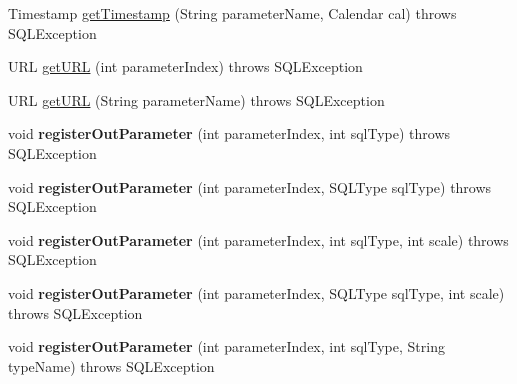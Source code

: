 \begin{DoxyCompactItemize}
\item 
Timestamp \mbox{\hyperlink{classcom_1_1mysql_1_1cj_1_1jdbc_1_1_callable_statement_ae256b922dcf07dac53e51154a618f1c3}{get\+Timestamp}} (String parameter\+Name, Calendar cal)  throws S\+Q\+L\+Exception 
\item 
U\+RL \mbox{\hyperlink{classcom_1_1mysql_1_1cj_1_1jdbc_1_1_callable_statement_a64d354f54f05a378cc69bff200a58093}{get\+U\+RL}} (int parameter\+Index)  throws S\+Q\+L\+Exception 
\item 
U\+RL \mbox{\hyperlink{classcom_1_1mysql_1_1cj_1_1jdbc_1_1_callable_statement_a08e77360a042f37ef9afdd164461e343}{get\+U\+RL}} (String parameter\+Name)  throws S\+Q\+L\+Exception 
\item 
\mbox{\label{classcom_1_1mysql_1_1cj_1_1jdbc_1_1_callable_statement_ad0d91ad3712a15309404949c3cc97739}} 
void {\bfseries register\+Out\+Parameter} (int parameter\+Index, int sql\+Type)  throws S\+Q\+L\+Exception 
\item 
\mbox{\label{classcom_1_1mysql_1_1cj_1_1jdbc_1_1_callable_statement_af786267d341962a98bab672e1e7264be}} 
void {\bfseries register\+Out\+Parameter} (int parameter\+Index, S\+Q\+L\+Type sql\+Type)  throws S\+Q\+L\+Exception 
\item 
\mbox{\label{classcom_1_1mysql_1_1cj_1_1jdbc_1_1_callable_statement_afe234609ae506d56697f519c3d29ebf8}} 
void {\bfseries register\+Out\+Parameter} (int parameter\+Index, int sql\+Type, int scale)  throws S\+Q\+L\+Exception 
\item 
\mbox{\label{classcom_1_1mysql_1_1cj_1_1jdbc_1_1_callable_statement_ae9462bde5501d87b6c7abb207b3e651f}} 
void {\bfseries register\+Out\+Parameter} (int parameter\+Index, S\+Q\+L\+Type sql\+Type, int scale)  throws S\+Q\+L\+Exception 
\item 
\mbox{\label{classcom_1_1mysql_1_1cj_1_1jdbc_1_1_callable_statement_a459e48382513438b924cd04576796915}} 
void {\bfseries register\+Out\+Parameter} (int parameter\+Index, int sql\+Type, String type\+Name)  throws S\+Q\+L\+Exception 
\item 

\end{DoxyCompactItemize}
